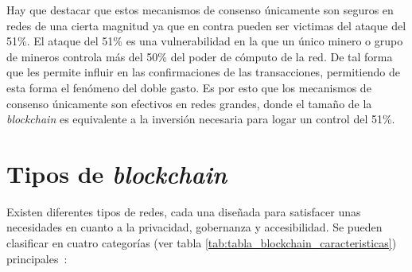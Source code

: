 Hay que destacar que estos mecanismos de consenso únicamente son seguros en redes de una cierta magnitud ya que en contra pueden ser victimas del ataque del 51\%.
El ataque del 51\% es una vulnerabilidad en la que un único minero o grupo de mineros controla más del 50\% del poder de cómputo de la red. De tal forma que les permite influir en las confirmaciones de las transacciones, permitiendo de esta forma el fenómeno del doble gasto.
Es por esto que los mecanismos de consenso únicamente son efectivos en redes grandes, donde el tamaño de la \textit{blockchain} es equivalente a la inversión necesaria para logar un control del 51\%.




\section{Tipos de \textit{blockchain}}

Existen diferentes tipos de redes, cada una diseñada para satisfacer unas necesidades en cuanto a la privacidad, gobernanza y accesibilidad. 
Se pueden clasificar en cuatro categorías (ver tabla \ref{tab:tabla_blockchain_caracteristicas}) principales~\cite{introducciónBlockchain}:


